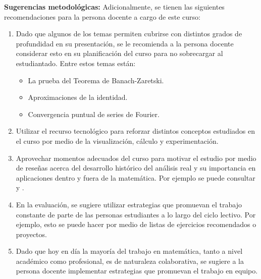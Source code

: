 \begin{refsection}
\textbf{Sugerencias metodológicas:} Adicionalmente, se tienen las siguientes recomendaciones para la persona docente a cargo de este curso:
\begin{enumerate}
    \item Dado que algunos de los temas permiten cubrirse con distintos grados de profundidad en su presentación, se le recomienda a la persona docente considerar esto en su planificación del curso para no sobrecargar al estudiantado. Entre estos temas están: 
    \begin{itemize}
        \item La prueba del Teorema de Banach-Zaretski.
        \item Aproximaciones de la identidad.
        \item Convergencia puntual de series de Fourier.
    \end{itemize}
    \item Utilizar el recurso tecnológico para reforzar distintos conceptos estudiados en el curso por medio de la visualización, cálculo y experimentación.
    \item Aprovechar momentos adecuados del curso para motivar el estudio por medio de reseñas acerca del desarrollo histórico del análisis real y su importancia en aplicaciones dentro y fuera de la matemática. Por ejemplo se puede consultar \cite{Fol16} y \cite{Bre08}.
    \item En la evaluación, se sugiere utilizar estrategias que promuevan el trabajo constante de parte de las personas estudiantes a lo largo del ciclo lectivo. Por ejemplo, esto se puede hacer por medio de listas de ejercicios recomendados o proyectos.
    \item Dado que hoy en día la mayoría del trabajo en matemática, tanto a nivel académico como profesional, es de naturaleza colaborativa, se sugiere a la persona docente implementar estrategias que promuevan el trabajo en equipo.
\end{enumerate}



\nocite{Lie01}
\nocite{RF10}
\nocite{WZ15}
\nocite{SS05}
\nocite{Hei19}
\nocite{BBT08}
\nocite{Bre08}
\nocite{Fol99}
\nocite{Hei18}
\nocite{Duo01}
\nocite{Kat04}
\nocite{Fol92}
\nocite{SS103}
\nocite{DM72}




\printcursosbibliography
\end{refsection}
